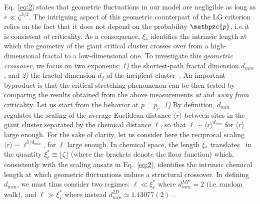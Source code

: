 \documentclass[aps, groupedaddress, superscriptaddress, prl, reprint]{revtex4-1}
\begin{document}
Eq.~\eqref{eq:2} states that geometric fluctuations in our model are negligible as long as $r\ll\zeta^{3/2}$. %
The intriguing aspect of this geometric counterpart of the LG criterion relies on the fact that it does not depend on the probability $\mathpzc{p}$, i.e.\,it is consistent {\em at} criticality.
As a consequence, $\xi_*$ identifies the intrinsic length at which the geometry of the giant critical cluster crosses over from a high-dimensional fractal to a low-dimensional one. 
To investigate this {\em geometric crossover}, we focus on two exponents: \emph{1)} the shortest-path fractal dimension $d_{min}$, %
and \emph{2)} the fractal dimension $d_f$ of the incipient cluster~\cite{BuH012}. 
An important byproduct is that the critical stretching phenomenon can be then tested by comparing the results obtained from the above measurements {\em at} and {\em away from} criticality.
Let us start from the behavior at $p=p_c$. 
\emph{1)} By definition, $d_{min}$ regulates the scaling of the average Euclidean distance $\langle r\rangle$ between sites in the giant cluster separated by the chemical distance %
$\ell$, so that $\ell\sim\langle r\rangle^{d_{min}}$ for $\langle r\rangle$ large enough. 
For the sake of clarity, let us consider here the reciprocal scaling $\langle r\rangle\sim\ell^{1/d_{min}}$, for $\ell$ large enough. 
In chemical space, the length $\xi_*$ translates~\cite{note2} in the quantity $\xi^*_\ell\equiv\lfloor\zeta\rfloor$ (where the brackets denote the floor function) which, consistently with the scaling ansatz in Eq.~\eqref{eq:2}, identifies the intrinsic chemical length at which geometric fluctuations induce a structural crossover.
In defining $d_{min}$, we must thus consider two regimes: $\ell\ll\xi_\ell^*$ where $d_{min}^{MF}=2$ (i.e.\,random walk), and $\ell\gg\xi_\ell^*$ where instead $d_{min}^{2D}\simeq1.13077(2)$~\cite{dmin}. 
\end{document}
